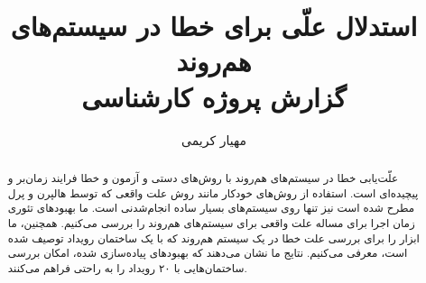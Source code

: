 \documentclass{article}
\title{
  استدلال علّی برای خطا در سیستم‌های هم‌روند \\
  \large
  گزارش پروژه کارشناسی
}
\author{مهیار کریمی}
\theoremstyle{definition}
\theoremstyle{remark}
\begin{document}
\maketitle

\begin{abstract}
  علّت‌یابی خطا در سیستم‌های هم‌روند با
  روش‌های دستی و آزمون و خطا فرایند زمان‌بر
  و پیچیده‌ای است. استفاده از روش‌های
  خودکار مانند روش علت واقعی که توسط
  هالپرن و پرل مطرح شده است نیز تنها
  روی سیستم‌های بسیار ساده انجام‌شدنی است.
  ما بهبودهای تئوری زمان اجرا برای مساله علت واقعی
  برای سیستم‌های هم‌روند را بررسی می‌کنیم.
  همچنین، ما ابزار
  را برای بررسی علت خطا در یک سیستم هم‌روند
  که با یک ساختمان رویداد توصیف شده است، معرفی می‌کنیم.
  نتایج ما نشان می‌دهند که بهبودهای پیاده‌سازی شده،
  امکان بررسی ساختمان‌هایی با ۲۰ رویداد را
  به راحتی فراهم می‌کنند.
\end{abstract}







\end{document}
